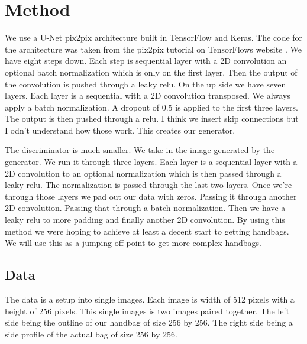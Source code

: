 \documentclass[conference]{IEEEtran}
\begin{document}
\section{Method}
We use a U-Net pix2pix architecture built in TensorFlow and Keras. The code for the
architecture was taken from the pix2pix tutorial on TensorFlows website \cite{pix2pix}.
We have eight steps down. Each step is sequential layer with a 2D convolution an optional
batch normalization which is only on the first layer. Then the output of the convolution is
pushed through a leaky relu. On the up side we have seven layers. Each layer is a sequential
with a 2D convolution transposed. We always apply a batch normalization. A dropout of 0.5 is
applied to the first three layers. The output is then pushed through a relu. I think we
insert skip connections but I odn't understand how those work. This creates our generator.
\par
The discriminator is much smaller. We take in the image generated by the generator. We run
it through three layers. Each layer is a sequential layer with a 2D convolution to an optional
normalization which is then passed through a leaky relu. The normalization is passed through
the last two layers. Once we're through those layers we pad out our data with zeros. Passing it
through another 2D convolution. Passing that through a batch normalization. Then we have a
leaky relu to more padding and finally another 2D convolution.
By using this method we were hoping to achieve at least a decent start to getting handbags.
We will use this as a jumping off point to get more complex handbags.
\subsection{Data}
The data is a setup into single images. Each image is width of 512 pixels with a
height of 256 pixels. This single images is two images paired together. The left side being
the outline of our handbag of size 256 by 256. The right side being a side profile of the
actual bag of size 256 by 256.
\end{document}
